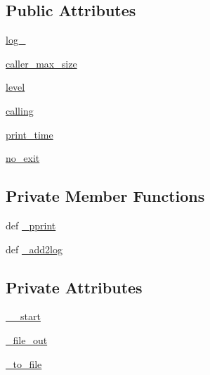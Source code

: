 \subsection*{Public Attributes}
\begin{DoxyCompactItemize}
\item 
\hyperlink{classpyneb_1_1utils_1_1logging_1_1my__logging_a4bda17b594629b5490207080dbcb3bbd}{log\+\_\+}
\item 
\hyperlink{classpyneb_1_1utils_1_1logging_1_1my__logging_a0449825f771bc794da88ba49666726d5}{caller\+\_\+max\+\_\+size}
\item 
\hyperlink{classpyneb_1_1utils_1_1logging_1_1my__logging_aa70215328c3f7a97a607c584026e144a}{level}
\item 
\hyperlink{classpyneb_1_1utils_1_1logging_1_1my__logging_a38735db2b351731f0fb79d4a0eb231ab}{calling}
\item 
\hyperlink{classpyneb_1_1utils_1_1logging_1_1my__logging_aba4514cb95d832e8abf7f31f77c27606}{print\+\_\+time}
\item 
\hyperlink{classpyneb_1_1utils_1_1logging_1_1my__logging_aa84eff388fc826a600e063d8cf7c4f63}{no\+\_\+exit}
\end{DoxyCompactItemize}
\subsection*{Private Member Functions}
\begin{DoxyCompactItemize}
\item 
def \hyperlink{classpyneb_1_1utils_1_1logging_1_1my__logging_a8f54e897998e958e5e211eb11fa02c4a}{\+\_\+pprint}
\item 
def \hyperlink{classpyneb_1_1utils_1_1logging_1_1my__logging_a8de4d2383bfa53411876a066e1bf72de}{\+\_\+add2log}
\end{DoxyCompactItemize}
\subsection*{Private Attributes}
\begin{DoxyCompactItemize}
\item 
\hyperlink{classpyneb_1_1utils_1_1logging_1_1my__logging_af75641557adadbef4e010a5c0b9f9513}{\+\_\+\+\_\+start}
\item 
\hyperlink{classpyneb_1_1utils_1_1logging_1_1my__logging_ac22b310e16b6f3a4790ac7658b2c0284}{\+\_\+file\+\_\+out}
\item 
\hyperlink{classpyneb_1_1utils_1_1logging_1_1my__logging_a6fd66745606a3cc0477edafcfdd24fe2}{\+\_\+to\+\_\+file}
\end{DoxyCompactItemize}


